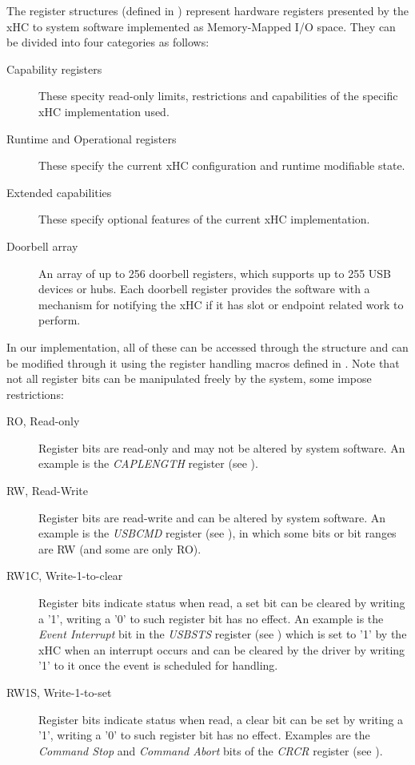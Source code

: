 The register structures (defined in )
represent hardware registers presented by the xHC to system software
implemented as Memory-Mapped I/O space. They can be divided into four categories as follows:
~
\begin{description}
	\item[Capability registers]
		These specity read-only limits, restrictions and capabilities of the specific
		xHC implementation used.
	\item[Runtime and Operational registers]
		These specify the current xHC configuration and runtime modifiable state.
	\item[Extended capabilities]
		These specify optional features of the current xHC implementation.
	\item[Doorbell array]
		An array of up to 256 doorbell registers, which supports up to 255 USB devices
		or hubs. Each doorbell register provides the software with a mechanism for
		notifying the xHC if it has slot or endpoint related work to perform.
\end{description}

In our implementation, all of these can be accessed through the  structure and
can be modified through it using the register handling macros defined in
. Note that not all register bits can be
manipulated freely by the system, some impose restrictions:
~
\begin{description}
	\item[RO, Read-only]
		Register bits are read-only and may not be altered by system software. An example
		is the \textit{CAPLENGTH} register (see ).
	\item[RW, Read-Write]
		Register bits are read-write and can be altered by system software. An example
		is the \textit{USBCMD} register (see ), in which some bits or bit ranges
		are RW (and some are only RO).
	\item[RW1C, Write-1-to-clear]
		Register bits indicate status when read, a set bit can be cleared by writing
		a '1', writing a '0' to such register bit has no effect. An example is
		the \textit{Event Interrupt} bit in the \textit{USBSTS} register (see ) which is set
		to '1' by the xHC when an interrupt occurs and can be cleared by the driver
		by writing '1' to it once the event is scheduled for handling.
	\item[RW1S, Write-1-to-set]
		Register bits indicate status when read, a clear bit can be set by writing
		a '1', writing a '0' to such register bit has no effect. Examples are the
		\textit{Command Stop} and \textit{Command Abort} bits of the \textit{CRCR} register
		(see ).
\end{description}

